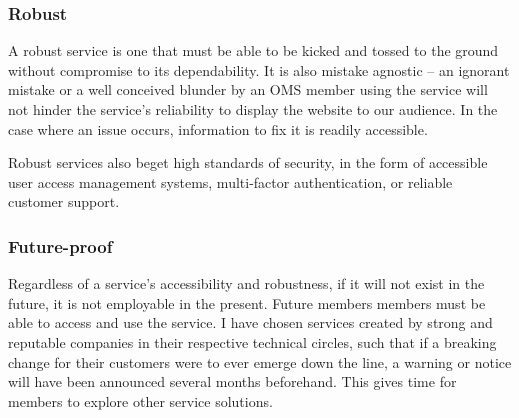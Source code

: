 \subsubsection*{Robust}
 A robust service is one that must be able to be kicked and tossed to the ground without compromise to its dependability. It is also mistake agnostic – an ignorant mistake or a well conceived blunder by an OMS member using the service will not hinder the service's reliability to display the website to our audience. In the case where an issue occurs, information to fix it is readily accessible.

 Robust services also beget high standards of security, in the form of accessible user access management systems, multi-factor authentication, or reliable customer support.

\subsubsection*{Future-proof}
Regardless of a service's accessibility and robustness, if it will not exist in the future, it is not employable in the present. Future members members must be able to access and use the service. I have chosen services created by strong and reputable companies in their respective technical circles, such that if a breaking change for their customers were to ever emerge down the line, a warning or notice will have been announced several months beforehand. This gives time for members to explore other service solutions.
